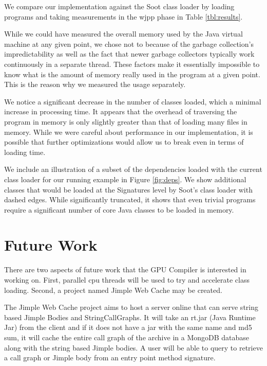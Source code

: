 \documentclass{sigplanconf}
\begin{document}
We compare our implementation against the Soot class loader by loading programs and taking measurements in the wjpp phase in Table \ref{tbl:results}.

While we could have measured the overall memory used by the Java virtual machine at any given point, we chose not to because of the garbage collection's impredictability as well as the fact that newer garbage collectors typically work continuously in a separate thread. These factors make it essentially impossible to know what is the amount of memory really used in the program at a given point. This is the reason why we measured the \sootclass usage separately.

We notice a significant decrease in the number of classes loaded, which a minimal increase in processing time. It appears that the overhead of traversing the program in memory is only slightly greater than that of loading many files in memory. While we were careful about performance in our implementation, it is possible that further optimizations would allow us to break even in terms of loading time.

We include an illustration of a subset of the dependencies loaded with the current class loader for our running example in Figure \ref{fig:deps}. We show additional classes that would be loaded at the Signatures level by Soot's class loader with dashed edges. While significantly truncated, it shows that even trivial programs require a significant number of core Java classes to be loaded in memory.

\FloatBarrier

\section{Future Work}
\label{sec:future}
There are two aspects of future work that the \rb GPU Compiler is interested in working on. First, parallel cpu threads will be used to try and accelerate class loading. Second, a project named Jimple Web Cache may be created.

The Jimple Web Cache project aims to host a server online that can serve string based Jimple Bodies and StringCallGraphs. It will take an rt.jar (Java Runtime Jar) from the client and if it does not have a jar with the same name and md5 sum, it will cache the entire call graph of the archive in a MongoDB database along with the string based Jimple bodies. A user will be able to query to retrieve a call graph or Jimple body from an entry point method signature.
\end{document}

